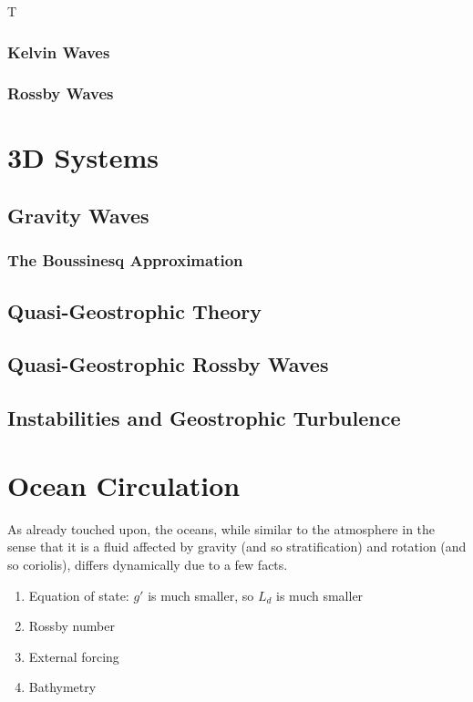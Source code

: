 T


\subsection{Kelvin Waves}

\subsection{Rossby Waves}

\chapter{3D Systems}

\section{Gravity Waves}

\subsection{The Boussinesq Approximation}

\section{Quasi-Geostrophic Theory}

\section{Quasi-Geostrophic Rossby Waves}

\section{Instabilities and Geostrophic Turbulence}

\chapter{Ocean Circulation}

As already touched upon, the oceans, while similar to the atmosphere in the sense that it is a fluid affected by gravity (and so stratification) and rotation (and so coriolis), differs dynamically due to a few facts.

\begin{enumerate}
    \item Equation of state: $g'$ is much smaller, so $L_d$ is much smaller
    \item Rossby number
    \item External forcing
    \item Bathymetry
\end{enumerate}

